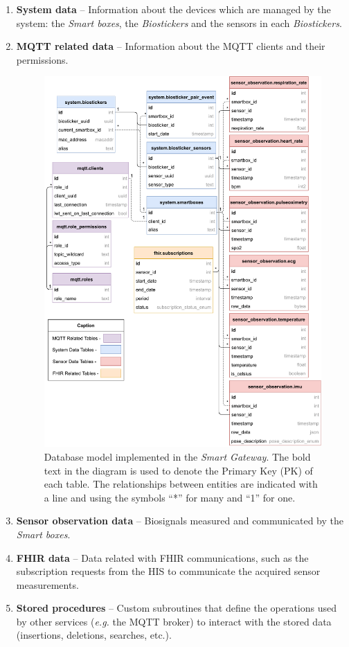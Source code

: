 \begin{enumerate}
    \item \textbf{System data} -- Information about the devices which are managed by the system: the \textit{Smart boxes}, the \textit{Biostickers} and the sensors in each \textit{Biostickers}. 
    \item \textbf{\acs{MQTT} related data} -- Information about the \acs{MQTT} clients and their permissions. 
    \begin{figure}[H]
        \centering
        \includegraphics[width=0.9\linewidth]{images/database-schema-general.pdf}
        \caption[Database model implemented in the \textit{Smart Gateway}.]{Database model implemented in the \textit{Smart Gateway}. The bold text in the diagram is used to denote the Primary Key (PK) of each table. The relationships between entities are indicated with a line and using the symbols ``*'' for many and ``1'' for one.}
        \label{fig:wow-dbschema-full}
    \end{figure}
    \item \textbf{Sensor observation data} -- Biosignals measured and communicated by the \textit{Smart boxes}.
    \item \textbf{\acs{FHIR} data} -- Data related with \acs{FHIR} communications, such as the subscription requests from the \acs{HIS} to communicate the acquired sensor measurements.
    \item \textbf{Stored procedures} -- Custom subroutines that define the operations used by other services (\textit{e.g.} the \acs{MQTT} broker) to interact with the stored data (insertions, deletions, searches, etc.).
\end{enumerate}

